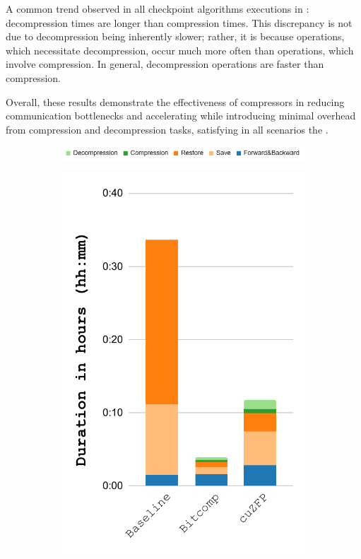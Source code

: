 \documentclass[Ingles,Final]{ic-tese-v3}
\begin{document}
A common trend observed in all checkpoint algorithms executions in : decompression times are longer than compression times. This discrepancy is not due to decompression being inherently slower; rather, it is because \restore operations, which necessitate decompression, occur much more often than \save operations, which involve compression. In general, decompression operations are faster than compression.

Overall, these results demonstrate the effectiveness of compressors in reducing communication bottlenecks and accelerating \awave while introducing minimal overhead from compression and decompression tasks, satisfying in all scenarios the .

\begin{figure}[h!]
    \centering
    \begin{subfigure}{0.8\textwidth}
        \includegraphics[width=\textwidth,trim={0 0 0 0},clip]{figures/compress_breakdown/legend.png}
        \label{fig:compress_breakdown_legend}
    \end{subfigure}
    \begin{subfigure}{0.3\textwidth}
        \includegraphics[width=\textwidth,trim={0 0 0 0},clip]{figures/compress_breakdown/breakdown_compress_salt_revolve.pdf}

\end{subfigure}
\end{figure}
\end{document}
